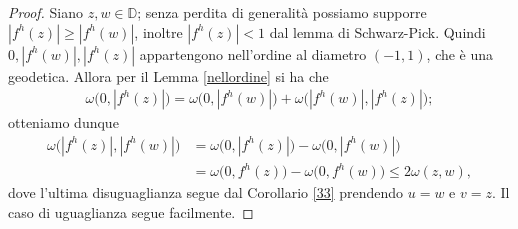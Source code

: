 \begin{proof}
  Siano $z, w \in \mathbb{D}$; senza perdita di generalità possiamo supporre $|f^h(z)| \ge |f^h(w)|$, inoltre $|f^h(z)|<1$ dal lemma di Schwarz-Pick. Quindi $0, |f^h(w)|, |f^h(z)|$ appartengono nell'ordine al diametro $(-1,1)$, che è una geodetica. Allora per il Lemma \ref{nellordine} si ha che
  \begin{align*}
    \omega\bigl(0,|f^h(z)|\bigr)=\omega\bigl(0,|f^h(w)|\bigr)+\omega\bigl(|f^h(w)|,|f^h(z)|\bigr);
  \end{align*}
  otteniamo dunque
  \begin{align*}
    \omega\bigl(|f^h(z)|, |f^h(w)|\bigr)&=\omega\bigl(0,|f^h(z)|\bigr)-\omega\bigl(0,|f^h(w)|\bigr) \\
    & =\omega\bigl(0,f^h(z)\bigr)-\omega\bigl(0,f^h(w)\bigr) \le 2\omega(z,w),
  \end{align*}
  dove l'ultima disuguaglianza segue dal Corollario \ref{33} prendendo $u=w$ e $v=z$. Il caso di uguaglianza segue facilmente.
\end{proof}
